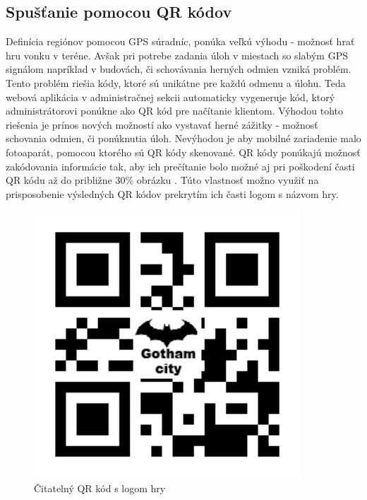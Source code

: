 \subsection{Spušťanie pomocou QR kódov}

Definícia regiónov pomocou GPS súradníc, ponúka veľkú výhodu - možnosť hrať hru vonku v teréne. Avšak pri potrebe zadania úloh v miestach so slabým GPS signálom napríklad v budovách, či schovávania herných odmien vzniká problém. Tento problém riešia kódy, ktoré sú unikátne pre každú odmenu a úlohu. Teda webová aplikácia v administračnej sekcii automaticky vygeneruje kód, ktorý administrátorovi ponúkne ako QR kód pre načítanie klientom. Výhodou tohto riešenia je prínos nových možností ako vystavať herné zážitky - možnosť schovania odmien, či ponúknutia úloh. Nevýhodou je aby mobilné zariadenie malo fotoaparát, pomocou ktorého sú QR kódy skenované. QR kódy ponúkajú možnosť zakódovania informácie tak, aby ich prečítanie bolo možné aj pri poškodení časti QR kódu až do približne 30\% obrázku \cite{qr-error}. Túto vlastnosť možno využiť na prisposobenie výsledných QR kódov prekrytím ich časti logom s názvom hry.

\begin{figure}[h]
  \centering
  \includegraphics[height=10cm]{mainmatter/imgs/qrcode.png}
  \caption{Čitatelný QR kód s logom hry}
  \label{fig:qrcode}
\end{figure}


